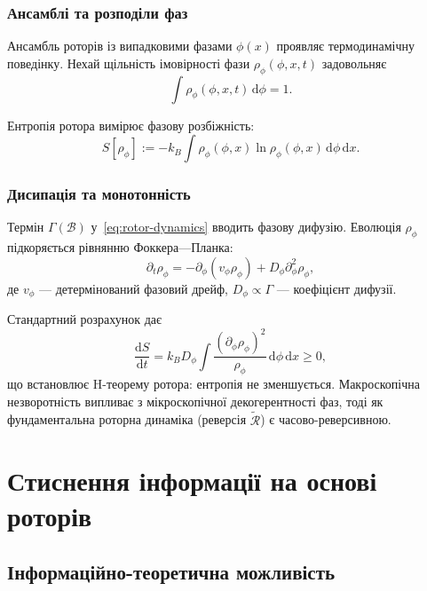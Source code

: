 \documentclass[11pt,a4paper]{article}
\newcommand{\rev}[1]{\widetilde{#1}}           %
\newcommand{\Rotor}{\mathcal{R}}
\newcommand{\Biv}{\mathcal{B}}
\theoremstyle{definition}
\theoremstyle{plain}
\theoremstyle{remark}
\begin{document}
\subsubsection{Ансамблі та розподіли фаз}

Ансамбль роторів із випадковими фазами $\phi(x)$ проявляє термодинамічну поведінку. Нехай щільність імовірності фази $\rho_\phi(\phi,x,t)$ задовольняє
\begin{equation}
\int \rho_\phi(\phi,x,t)\, \mathrm{d}\phi = 1.
\end{equation}

Ентропія ротора вимірює фазову розбіжність:
\begin{equation}
S[\rho_\phi] := -k_B \int \rho_\phi(\phi,x) \ln \rho_\phi(\phi,x)\, \mathrm{d}\phi\, \mathrm{d}x.
\end{equation}

\subsubsection{Дисипація та монотонність}

Термін $\Gamma(\Biv)$ у~\eqref{eq:rotor-dynamics} вводить фазову дифузію. Еволюція $\rho_\phi$ підкоряється рівнянню Фоккера—Планка:
\begin{equation}
\partial_t \rho_\phi = -\partial_\phi\!\left(v_\phi \rho_\phi\right) + D_\phi \partial_\phi^2 \rho_\phi,
\end{equation}
де $v_\phi$ — детермінований фазовий дрейф, $D_\phi \propto \Gamma$ — коефіцієнт дифузії.

Стандартний розрахунок дає
\begin{equation}
\frac{\mathrm{d}S}{\mathrm{d}t} = k_B D_\phi \int \frac{(\partial_\phi \rho_\phi)^2}{\rho_\phi}\, \mathrm{d}\phi\, \mathrm{d}x \geq 0,
\end{equation}
що встановлює H-теорему ротора: ентропія не зменшується. Макроскопічна незворотність випливає з мікроскопічної декогерентності фаз, тоді як фундаментальна роторна динаміка (реверсія $\rev{\Rotor}$) є часово-реверсивною.

\vspace{1em}

\section{Стиснення інформації на основі роторів}\label{sec:compression}

\subsection{Інформаційно-теоретична можливість}
\end{document}

